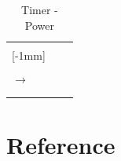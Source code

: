 \begin{table}[H]
\begin{tabu}{ X[1,c,m] | X[1,c,m] | X[1,c,m] }
  \thrule
   &  &  \\ \mrule

  [-1mm]{}
    &   &  \\ 
  &     &  \\ \mrule

   $\rightarrow$  &   &  \\ \mrule
   &     &  \\

  \bhrule
\end{tabu}
\caption {Timer - Power}
\end{table}

\section{Reference}

